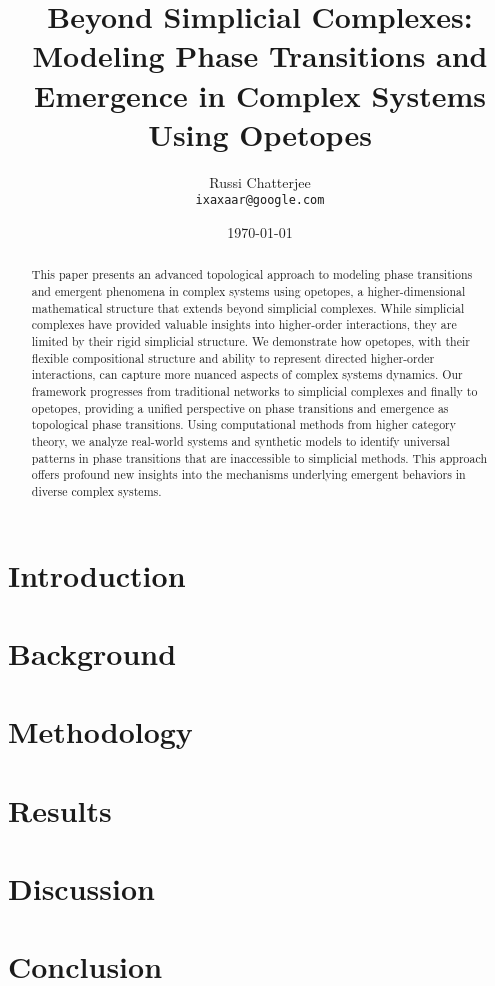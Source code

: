 \documentclass[12pt,a4paper]{article}
\title{Beyond Simplicial Complexes: Modeling Phase Transitions and Emergence in Complex Systems Using Opetopes}
\author{Russi Chatterjee \\ \texttt{ixaxaar@google.com}}
\date{\today}
\begin{document}
\maketitle

\thispagestyle{empty}

\begin{abstract}
\noindent
This paper presents an advanced topological approach to modeling phase transitions and emergent phenomena in complex systems using opetopes, a higher-dimensional mathematical structure that extends beyond simplicial complexes. While simplicial complexes have provided valuable insights into higher-order interactions, they are limited by their rigid simplicial structure. We demonstrate how opetopes, with their flexible compositional structure and ability to represent directed higher-order interactions, can capture more nuanced aspects of complex systems dynamics. Our framework progresses from traditional networks to simplicial complexes and finally to opetopes, providing a unified perspective on phase transitions and emergence as topological phase transitions. Using computational methods from higher category theory, we analyze real-world systems and synthetic models to identify universal patterns in phase transitions that are inaccessible to simplicial methods. This approach offers profound new insights into the mechanisms underlying emergent behaviors in diverse complex systems.
\end{abstract}

\vspace{1cm}
\section{Introduction}


\section{Background}


\section{Methodology}


\section{Results}


\section{Discussion}


\section{Conclusion}




\end{document}
